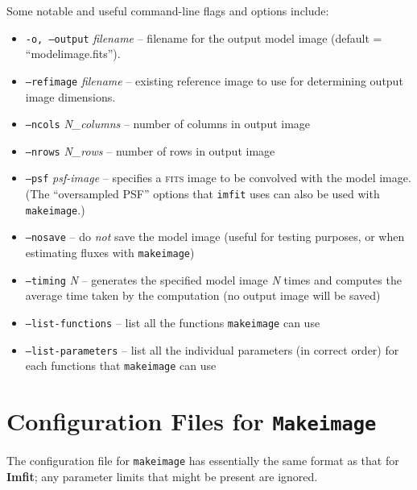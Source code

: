\documentclass[10pt,a4paper,article]{memoir}
\newcommand{\imfit}{\textbf{Imfit}}
\newcommand{\imfitprog}{\texttt{imfit}}
\newcommand{\makeimage}{\texttt{makeimage}}
\newcommand{\Makeimage}{\texttt{Makeimage}}
\begin{document}
Some notable and useful command-line flags and options include:
\begin{itemize}
\item \texttt{-o, --output} \textit{filename} -- filename for the output model
image (default = ``modelimage.fits'').

\item \texttt{--refimage} \textit{filename} -- existing reference image to
use for determining output image dimensions.

\item \texttt{--ncols} \textit{N\_columns} -- number of columns in output image

\item \texttt{--nrows} \textit{N\_rows} -- number of rows in output image

\bigskip

\item \texttt{--psf} \textit{psf-image} -- specifies a \textsc{fits} image to be convolved
with the model image. (The ``oversampled PSF'' options that \imfitprog{} uses can
also be used with \makeimage.)

\bigskip

\item \texttt{--nosave} -- do \textit{not} save the model image (useful for testing
purposes, or when estimating fluxes with \makeimage)

\bigskip

\item \texttt{--timing} \textit{N} -- generates the specified model
image \textit{N} times and computes the average time taken by the computation
(no output image will be saved)

\bigskip

\item \texttt{--list-functions} -- list all the functions \makeimage{}
can use

\item \texttt{--list-parameters} -- list all the individual parameters (in correct order)
for each functions that \makeimage{} can use


\end{itemize}



\section{Configuration Files for \Makeimage{}}

The configuration file for \makeimage{} has essentially the same format as
that for \imfit; any parameter limits that might be present are ignored.
\end{document}
